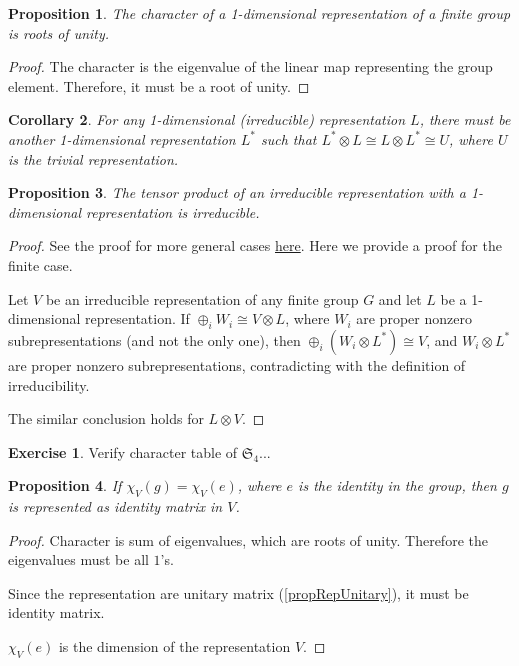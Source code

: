 \documentclass[12pt, letterpaper]{article}
\newtheorem{prop}{Proposition}[section]
\newtheorem{cor}[prop]{Corollary}
\theoremstyle{definition}
\theoremstyle{remark}
\theoremstyle{definition}
\newtheorem{exe}{Exercise}[section]
\theoremstyle{plain}
\numberwithin{equation}{section}
\begin{document}
	\begin{prop}
		The character of a 1-dimensional representation of a finite group is roots of unity.
	\end{prop}
	\begin{proof}
		The character is the eigenvalue of the linear map representing the group element.
		Therefore, it must be a root of unity.
	\end{proof}
	\begin{cor}
		For any 1-dimensional (irreducible) representation $L$,
		there must be another 1-dimensional representation $L^*$ such that
		$L^*\otimes L \cong L\otimes L^* \cong U$,
		where $U$ is the trivial representation.
	\end{cor}
	\begin{prop}
		The tensor product of an irreducible representation with a 1-dimensional representation is irreducible.
	\end{prop}
	\begin{proof}
		See the proof for more general cases \href {https://math.stackexchange.com/questions/745262/why-does-the-tensor-product-of-an-irreducible-representation-with-the-sign-repre}{here}. Here we provide a proof for the finite case.
		
		Let $V$ be an irreducible representation of any finite group $G$ and let $L$ be a 1-dimensional representation.
		If $\oplus_i W_i \cong V \otimes L$, where $W_i$ are proper nonzero subrepresentations (and not the only one),
		then $\oplus_i (W_i\otimes L^*)\cong V$, and $W_i\otimes L^*$ are proper nonzero subrepresentations,
		contradicting with the definition of irreducibility.
		
		The similar conclusion holds for $L \otimes V$.
	\end{proof}
	\begin{exe}
		Verify character table of $\mathfrak{S}_4$...
	\end{exe}
	\begin{prop}
		If $\chi_V(g)=\chi_V(e)$, where $e$ is the identity in the group,
		then $g$ is represented as identity matrix in $V$.
	\end{prop}
	\begin{proof}
		Character is sum of eigenvalues, which are roots of unity.
		Therefore the eigenvalues must be all $1$'s.
		
		Since the representation are unitary matrix (\autoref{propRepUnitary}), it must be identity matrix.

		$\chi_V(e)$ is the dimension of the representation $V$.
	\end{proof}
\end{document}
